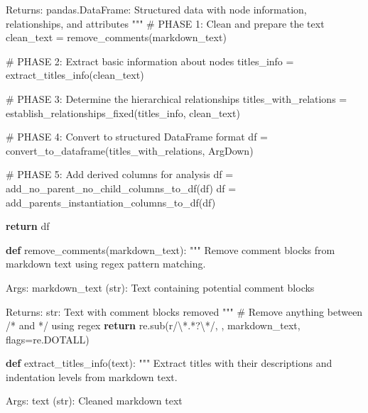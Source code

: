 \documentclass[
  11pt,
  letterpaper,
]{book}
\newenvironment{Shaded}{\begin{snugshade}}{\end{snugshade}}
\newcommand{\CharTok}[1]{\textcolor[rgb]{0.13,0.47,0.30}{#1}}
\newcommand{\CommentTok}[1]{\textcolor[rgb]{0.37,0.37,0.37}{#1}}
\newcommand{\ControlFlowTok}[1]{\textcolor[rgb]{0.00,0.23,0.31}{\textbf{#1}}}
\newcommand{\DecValTok}[1]{\textcolor[rgb]{0.68,0.00,0.00}{#1}}
\newcommand{\KeywordTok}[1]{\textcolor[rgb]{0.00,0.23,0.31}{\textbf{#1}}}
\newcommand{\NormalTok}[1]{\textcolor[rgb]{0.00,0.23,0.31}{#1}}
\newcommand{\OperatorTok}[1]{\textcolor[rgb]{0.37,0.37,0.37}{#1}}
\newcommand{\StringTok}[1]{\textcolor[rgb]{0.13,0.47,0.30}{#1}}
\newcommand{\VerbatimStringTok}[1]{\textcolor[rgb]{0.13,0.47,0.30}{#1}}
\begin{document}
\begin{Shaded}
\begin{Highlighting}[]
\CommentTok{    Returns:}
\CommentTok{        pandas.DataFrame: Structured data with node information, relationships, and attributes}
\CommentTok{    """}
    \CommentTok{\# PHASE 1: Clean and prepare the text}
\NormalTok{    clean\_text }\OperatorTok{=}\NormalTok{ remove\_comments(markdown\_text)}

    \CommentTok{\# PHASE 2: Extract basic information about nodes}
\NormalTok{    titles\_info }\OperatorTok{=}\NormalTok{ extract\_titles\_info(clean\_text)}

    \CommentTok{\# PHASE 3: Determine the hierarchical relationships}
\NormalTok{    titles\_with\_relations }\OperatorTok{=}\NormalTok{ establish\_relationships\_fixed(titles\_info, clean\_text)}

    \CommentTok{\# PHASE 4: Convert to structured DataFrame format}
\NormalTok{    df }\OperatorTok{=}\NormalTok{ convert\_to\_dataframe(titles\_with\_relations, ArgDown)}

    \CommentTok{\# PHASE 5: Add derived columns for analysis}
\NormalTok{    df }\OperatorTok{=}\NormalTok{ add\_no\_parent\_no\_child\_columns\_to\_df(df)}
\NormalTok{    df }\OperatorTok{=}\NormalTok{ add\_parents\_instantiation\_columns\_to\_df(df)}

    \ControlFlowTok{return}\NormalTok{ df}

\KeywordTok{def}\NormalTok{ remove\_comments(markdown\_text):}
    \CommentTok{"""}
\CommentTok{    Remove comment blocks from markdown text using regex pattern matching.}

\CommentTok{    Args:}
\CommentTok{        markdown\_text (str): Text containing potential comment blocks}

\CommentTok{    Returns:}
\CommentTok{        str: Text with comment blocks removed}
\CommentTok{    """}
    \CommentTok{\# Remove anything between /* and */ using regex}
    \ControlFlowTok{return}\NormalTok{ re.sub(}\VerbatimStringTok{r\textquotesingle{}/}\CharTok{\textbackslash{}*}\DecValTok{.}\OperatorTok{*?}\CharTok{\textbackslash{}*}\VerbatimStringTok{/\textquotesingle{}}\NormalTok{, }\StringTok{\textquotesingle{}\textquotesingle{}}\NormalTok{, markdown\_text, flags}\OperatorTok{=}\NormalTok{re.DOTALL)}

\KeywordTok{def}\NormalTok{ extract\_titles\_info(text):}
    \CommentTok{"""}
\CommentTok{    Extract titles with their descriptions and indentation levels from markdown text.}

\CommentTok{    Args:}
\CommentTok{        text (str): Cleaned markdown text}


\end{Highlighting}
\end{Shaded}
\end{document}
